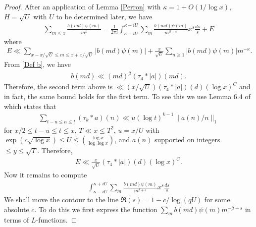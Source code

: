\documentclass[oneside, 12pt]{amsart}
\theoremstyle{definition}
\newcommand{\leqs}{\leqslant }
\newcommand{\geqs}{\geqslant }
\begin{document}
\begin{proof}
After an application of Lemma \ref{Perron} with $\kappa=1+O(1/\log x)$, $H=\sqrt{U}$ with $U$ to be determined later, we have 
\begin{align*}
\sum_{m\leq x}\frac{b(md)\psi(m)}{m^\beta}=\frac{1}{2\pi i}\int_{\kappa-iU}^{\kappa+iU}\sum_{m}\frac{b(md)\psi(m)}{m^{\beta+s}}x^s \frac{ds}{s}+E
\end{align*}
where 
\begin{align*}
E\ll \sum_{x-x/\sqrt{U}\leqs m\leqs x+x/\sqrt{U}}|b(md)\psi(m)| +\frac{x}{\sqrt{U}}\sum_{n\geqs 1}|b(md)\psi(m)|m^{-\kappa}.
\end{align*}
From \eqref{Def b}, we have 
\begin{align*}
b(md)\ll (md)^\beta (\tau_4* |a|)(md).
\end{align*}
Therefore, the second term above is 
$\ll ({x}/{\sqrt{U}})(\tau_4* |a|)(d)(\log x)^C$ and in fact, the same bound holds for the first term. To see this we use Lemma 6.4 of \cite{Ngdiscrete} which states that  
\begin{align*}
\sum_{t-u\leq n\leq t}(\tau_k*a)(n)\ll u (\log t)^{k-1}\|a(n)/n\|_1
\end{align*}
for $x/2\leq t-u \leq t\leq x$, $T\ll x\leq T^2$, $u=x/U$ with $\exp(c\sqrt{\log x})\leq U \leq \left( \frac{\log x}{\log \log x}\right)$, and $a(n)$ supported on integers $\leq y\leq \sqrt{T}$.
Therefore, 
\begin{align}
E\ll \frac{x}{\sqrt{U}}(\tau_4*|a|)(d)(\log x)^C.
\end{align}
Now it remains to compute 
\begin{align*}
\int_{\kappa-iU}^{\kappa+iU}\sum_{m}\frac{b(md)\psi(m)}{m^{\beta+s}}x^s \frac{ds}{s}
\end{align*}
We shall move the contour to the line $\Re(s)=1-c/\log (qU)$ for some absolute $c$. To do this we first express the
function $\sum_{m}b(md)\psi(m)m^{-\beta-s}$ in terms of $L$-functions.  
 

\end{proof}
\end{document}
